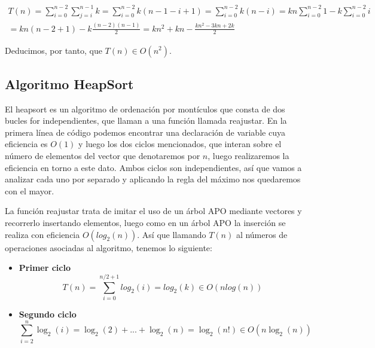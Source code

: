 \documentclass{homework}
\begin{document}
    \begin{equation*}
        \begin{split}
            T(n) = \sum_{i=0}^{n-2} \sum_{j=i}^{n-1} k = \sum_{i=0}^{n-2} k(n-1-i+1) = \sum_{i=0}^{n-2} k(n-i) = kn \sum_{i=0}^{n-2} 1  - k \sum_{i=0}^{n-2} i \\
            = kn(n-2+1) - k \frac{(n-2)(n-1)}{2} = kn^2 + kn - \frac{kn^2 - 3kn + 2k}{2}
        \end{split}
    \end{equation*}
    
    Deducimos, por tanto, que $T(n) \in O(n^2)$. 
    
    \subsection{Algoritmo HeapSort}
    
     

    El heapsort es un algoritmo de ordenación por montículos que consta de dos bucles for independientes, que llaman a una función llamada reajustar.
    En la primera línea de código podemos encontrar una declaración de variable cuya eficiencia es $O(1)$ y luego los dos ciclos mencionados, que interan 
    sobre el número de elementos del vector que denotaremos por $n$, luego realizaremos la eficiencia en torno a este dato. Ambos ciclos son independientes, 
    así que vamos a analizar cada uno por separado y aplicando la regla del máximo nos quedaremos con el mayor.
    
    La función reajustar trata de imitar el uso de un árbol APO mediante vectores y recorrerlo insertando elementos, luego como en un árbol APO la inserción se 
    realiza con eficiencia $O(log_2(n))$. Así que llamando $T(n)$ al números de operaciones asociadas al algoritmo, tenemos lo siguiente:
    
    \begin{itemize}
        \item \textbf{Primer ciclo}
        \begin{equation*}
            T(n) = \sum_{i=0}^{n/2 + 1} log_2(i) = log_2(k) \in O(nlog(n))
        \end{equation*} 

        \item \textbf{Segundo ciclo}
            $$\sum_{i=2}^{n} \log_2(i) = \log_2(2) + ... + \log_2(n) = \log_2(n!) \in O(n \log_2(n))$$
        
        
    \end{itemize}
\end{document}
